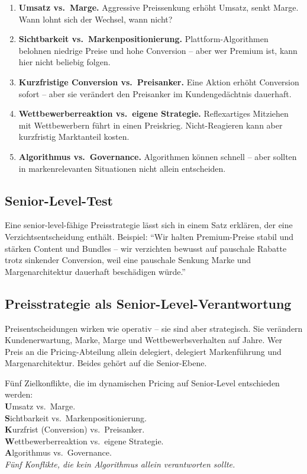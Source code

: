 \documentclass[11pt,a4paper,oneside]{article}
\newcommand{\caveatfontfallback}{\itshape}
\newcommand\caveatfont{\caveatfontfallback}%
\newcommand{\akzent}[1]{{\caveatfont\color{lpAmber}#1}}
\begin{document}
\begin{enumerate}
  \item \textbf{Umsatz vs.\ Marge.} Aggressive Preissenkung erhöht Umsatz, senkt Marge. Wann lohnt sich der Wechsel, wann nicht?
  \item \textbf{Sichtbarkeit vs.\ Markenpositionierung.} Plattform-Algorithmen belohnen niedrige Preise und hohe Conversion -- aber wer Premium ist, kann hier nicht beliebig folgen.
  \item \textbf{Kurzfristige Conversion vs.\ Preisanker.} Eine Aktion erhöht Conversion sofort -- aber sie verändert den Preisanker im Kundengedächtnis dauerhaft.
  \item \textbf{Wettbewerberreaktion vs.\ eigene Strategie.} Reflexartiges Mitziehen mit Wettbewerbern führt in einen Preiskrieg. Nicht-Reagieren kann aber kurzfristig Marktanteil kosten.
  \item \textbf{Algorithmus vs.\ Governance.} Algorithmen können schnell -- aber sollten in markenrelevanten Situationen nicht allein entscheiden.
\end{enumerate}

\subsection{Senior-Level-Test}

Eine senior-level-fähige Preisstrategie lässt sich in einem Satz erklären, der eine Verzichtsentscheidung enthält. Beispiel: ``Wir halten Premium-Preise stabil und stärken Content und Bundles -- wir verzichten bewusst auf pauschale Rabatte trotz sinkender Conversion, weil eine pauschale Senkung Marke und Margenarchitektur dauerhaft beschädigen würde.''

\subsection{Preisstrategie als Senior-Level-Verantwortung}

Preisentscheidungen wirken wie operativ -- sie sind aber strategisch. Sie verändern Kundenerwartung, Marke, Marge und Wettbewerbsverhalten auf Jahre. Wer Preis an die Pricing-Abteilung allein delegiert, delegiert Markenführung und Margenarchitektur. Beides gehört auf die Senior-Ebene.

\begin{eselsbox}[Eselsbrücke: \akzent{U-S-K-W-A}]
Fünf Zielkonflikte, die im dynamischen Pricing auf Senior-Level entschieden werden:\\[2pt]
\textbf{U}msatz vs.\ Marge.\\
\textbf{S}ichtbarkeit vs.\ Markenpositionierung.\\
\textbf{K}urzfrist (Conversion) vs.\ Preisanker.\\
\textbf{W}ettbewerberreaktion vs.\ eigene Strategie.\\
\textbf{A}lgorithmus vs.\ Governance.\\[2pt]
\emph{Fünf Konflikte, die kein Algorithmus allein verantworten sollte.}
\end{eselsbox}
\end{document}

